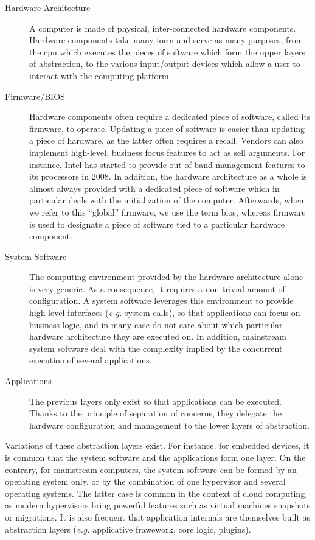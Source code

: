 \begin{description}
\item [Hardware Architecture]
  A computer is made of physical, inter-connected hardware components.
  Hardware components take many form and serve as many purposes, from the
  \ac{cpu} which executes the pieces of software which form the upper layers of
  abstraction, to the various input/output devices which allow a user to
  interact with the computing platform.
\item [Firmware/BIOS]
  Hardware components often require a dedicated piece of software, called its
  firmware, to operate.
  Updating a piece of software is easier than updating a piece of hardware, as
  the latter often requires a recall.
  Vendors can also implement high-level, business focus features to act as sell
  arguments.
  For instance, Intel has started to provide out-of-band management features to
  its processors in 2008.
  In addition, the hardware architecture as a whole is almost always provided
  with a dedicated piece of software which in particular deals with the
  initialization of the computer.
  Afterwards, when we refer to this ``global'' firmware, we use the term
  \ac{bios}, whereas firmware is used to designate a piece of software tied to a
  particular hardware component.
\item [System Software]
  The computing environment provided by the hardware architecture alone is very
  generic.
  As a consequence, it requires a non-trivial amount of configuration.
  A system software leverages this environment to provide high-level interfaces
  (\emph{e.g.} system calls), so that applications can focus on business logic,
  and in many case do not care about which particular hardware architecture they
  are executed on.
  In addition, mainstream system software deal with the complexity implied by
  the concurrent execution of several applications.
\item [Applications]
  The previous layers only exist so that applications can be executed.
  Thanks to the principle of separation of concerns, they delegate the hardware
  configuration and management to the lower layers of abstraction.
\end{description}

Variations of these abstraction layers exist.
%
For instance, for embedded devices, it is common that the system software and
the applications form one layer.
%
On the contrary, for mainstream computers, the system software can be formed by
an operating system only, or by the combination of one hypervisor and several
operating systems.
%
The latter case is common in the context of cloud computing, as modern
hypervisors bring powerful features such as virtual machines snapshots or
migrations.
%
It is also frequent that application internals are themselves built as
abstraction layers (\emph{e.g.} applicative frawework, core logic, plugins).

